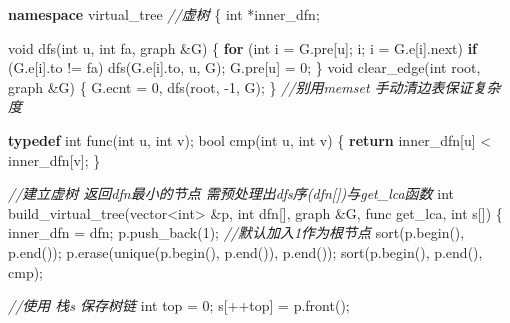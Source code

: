 \documentclass[
]{article}
\newenvironment{Shaded}{}{}
\newcommand{\CommentTok}[1]{\textcolor[rgb]{0.38,0.63,0.69}{\textit{#1}}}
\newcommand{\ControlFlowTok}[1]{\textcolor[rgb]{0.00,0.44,0.13}{\textbf{#1}}}
\newcommand{\DataTypeTok}[1]{\textcolor[rgb]{0.56,0.13,0.00}{#1}}
\newcommand{\DecValTok}[1]{\textcolor[rgb]{0.25,0.63,0.44}{#1}}
\newcommand{\KeywordTok}[1]{\textcolor[rgb]{0.00,0.44,0.13}{\textbf{#1}}}
\newcommand{\NormalTok}[1]{#1}
\begin{document}
\begin{Shaded}
\begin{Highlighting}[]
\KeywordTok{namespace}\NormalTok{ virtual\_tree }\CommentTok{//虚树}
\NormalTok{\{}
    \DataTypeTok{int}\NormalTok{ *inner\_dfn;}

    \DataTypeTok{void}\NormalTok{ dfs(}\DataTypeTok{int}\NormalTok{ u, }\DataTypeTok{int}\NormalTok{ fa, graph \&G)}
\NormalTok{    \{}
        \ControlFlowTok{for}\NormalTok{ (}\DataTypeTok{int}\NormalTok{ i = G.pre[u]; i; i = G.e[i].next)}
            \ControlFlowTok{if}\NormalTok{ (G.e[i].to != fa)}
\NormalTok{                dfs(G.e[i].to, u, G);}
\NormalTok{        G.pre[u] = }\DecValTok{0}\NormalTok{;}
\NormalTok{    \}}
    \DataTypeTok{void}\NormalTok{ clear\_edge(}\DataTypeTok{int}\NormalTok{ root, graph \&G) \{ G.ecnt = }\DecValTok{0}\NormalTok{, dfs(root, {-}}\DecValTok{1}\NormalTok{, G); \}}
    \CommentTok{//别用memset 手动清边表保证复杂度}

    \KeywordTok{typedef} \DataTypeTok{int}\NormalTok{ func(}\DataTypeTok{int}\NormalTok{ u, }\DataTypeTok{int}\NormalTok{ v);}
    \DataTypeTok{bool}\NormalTok{ cmp(}\DataTypeTok{int}\NormalTok{ u, }\DataTypeTok{int}\NormalTok{ v) \{ }\ControlFlowTok{return}\NormalTok{ inner\_dfn[u] \textless{} inner\_dfn[v]; \}}

    \CommentTok{//建立虚树 返回dfn最小的节点 需预处理出dfs序(dfn[])与get\_lca函数}
    \DataTypeTok{int}\NormalTok{ build\_virtual\_tree(vector\textless{}}\DataTypeTok{int}\NormalTok{\textgreater{} \&p, }\DataTypeTok{int}\NormalTok{ dfn[], graph \&G, func get\_lca, }\DataTypeTok{int}\NormalTok{ s[])}
\NormalTok{    \{}
\NormalTok{        inner\_dfn = dfn;}
\NormalTok{        p.push\_back(}\DecValTok{1}\NormalTok{); }\CommentTok{//默认加入1作为根节点}
\NormalTok{        sort(p.begin(), p.end());}
\NormalTok{        p.erase(unique(p.begin(), p.end()), p.end());}
\NormalTok{        sort(p.begin(), p.end(), cmp);}

        \CommentTok{//使用 栈s 保存树链}
        \DataTypeTok{int}\NormalTok{ top = }\DecValTok{0}\NormalTok{;}
\NormalTok{        s[++top] = p.front();}


\end{Highlighting}
\end{Shaded}
\end{document}
